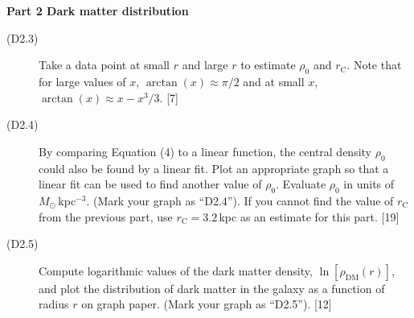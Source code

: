 \medskip
\textbf{Part 2 Dark matter distribution}

\begin{description}
\item[(D2.3)] Take a data point at small $r$ and large $r$ to estimate
  $\rho_0$ and $r_{\mathrm{C}}$. Note that for large values of $x$,
  $\arctan(x) \approx \pi/2$ and at small $x$,
  $\arctan(x) \approx x - x^3/3$. \hfill[7]
\item[(D2.4)] By comparing Equation (4) to a linear function, the central
  density $\rho_0$ could also be found by a linear fit. Plot an appropriate
  graph so that a linear fit can be used to find another value of $\rho_0$.
  Evaluate $\rho_0$ in units of $M_\odot$\,kpc$^{-3}$. (Mark your graph as
  ``D2.4''). If you cannot find the value of $r_{\mathrm{C}}$ from the
  previous part, use $r_{\mathrm{C}} = 3.2$\,kpc as an estimate for this
  part. \hfill[19]
\item[(D2.5)] Compute logarithmic values of the dark matter density,
  $\ln[\rho_{\mathrm{DM}}(r)]$, and plot the distribution of dark matter in
  the galaxy as a function of radius $r$ on graph paper. (Mark your graph as
  ``D2.5''). \hfill[12]
\end{description}
